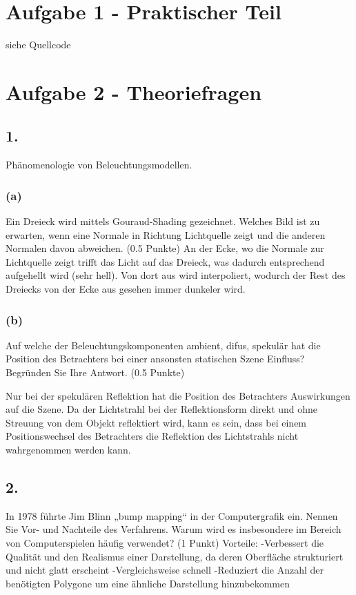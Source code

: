 \documentclass[12pt]{scrreprt}
\begin{document}


\chapter*{Aufgabe 1 - Praktischer Teil}

siehe Quellcode

\chapter*{Aufgabe 2 - Theoriefragen}
\section*{1.}
Phänomenologie von Beleuchtungsmodellen.
\subsection*{(a)}
Ein Dreieck wird mittels Gouraud-Shading gezeichnet. Welches Bild ist zu erwarten, wenn eine Normale in Richtung Lichtquelle zeigt und die anderen Normalen davon abweichen. (0.5 Punkte)
An der Ecke, wo die Normale zur Lichtquelle zeigt trifft das Licht auf das Dreieck, was dadurch entsprechend aufgehellt wird (sehr hell). Von dort aus wird interpoliert, wodurch der Rest des Dreiecks von der Ecke aus gesehen immer dunkeler wird.

\subsection*{(b)}
Auf welche der Beleuchtungskomponenten ambient, difus, spekulär hat die Position des Betrachters bei einer ansonsten statischen Szene Einﬂuss? Begründen Sie Ihre Antwort. (0.5 Punkte)

Nur bei der spekulären Reflektion hat die Position des Betrachters Auswirkungen auf die Szene. Da der Lichtstrahl bei der Reflektionsform direkt und ohne Streuung von dem Objekt reflektiert wird, kann es sein, dass bei einem Positionswechsel des Betrachters die Reflektion des Lichtstrahls nicht wahrgenommen werden kann.

\section*{2.}
In 1978 führte Jim Blinn „bump mapping“ in der Computergraﬁk ein. Nennen Sie Vor- und Nachteile des Verfahrens. Warum wird es insbesondere im Bereich von Computerspielen häuﬁg verwendet? (1 Punkt)
Vorteile:
-Verbessert die Qualität und den Realismus einer Darstellung, da deren Oberfläche strukturiert und nicht glatt erscheint
-Vergleichsweise schnell
-Reduziert die Anzahl der benötigten Polygone um eine ähnliche Darstellung hinzubekommen
\end{document}
